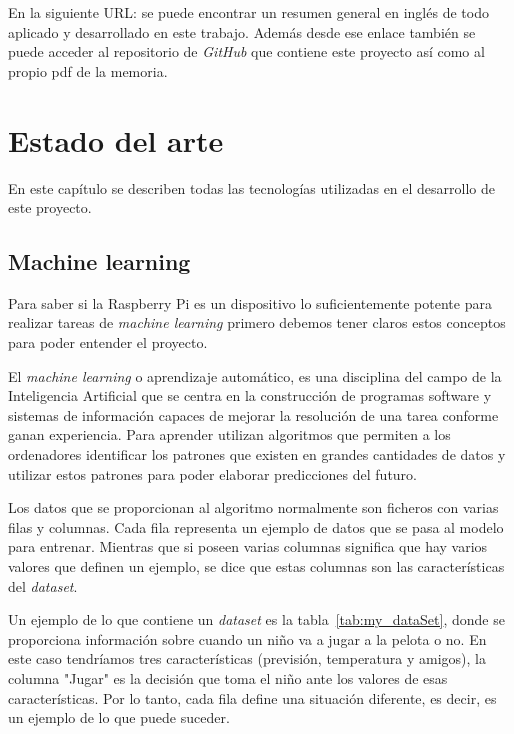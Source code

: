 \documentclass[a4paper, 12pt]{book}
\begin{document}
En la siguiente URL: se puede encontrar un resumen general en inglés de todo aplicado y desarrollado en este trabajo. Además desde ese enlace también se puede acceder al repositorio de \textit{GitHub} que contiene este proyecto así como al propio pdf de la memoria.

\cleardoublepage


\chapter{Estado del arte}               %
\label{chap:tecnologias}

En este capítulo se describen todas las tecnologías utilizadas en el desarrollo de este proyecto.

\section{Machine learning}
\label{sec:machine_learning}

Para saber si la Raspberry Pi es un dispositivo lo suficientemente potente para realizar tareas de \textit{machine learning} primero debemos tener claros estos conceptos para poder entender el proyecto.

 El \textit{machine learning} o aprendizaje automático, es una disciplina del campo de la Inteligencia Artificial que se centra en la construcción de programas software y sistemas de información capaces de mejorar la resolución de una tarea conforme ganan experiencia. Para aprender utilizan algoritmos que permiten a los ordenadores identificar los patrones que existen en grandes cantidades de datos y utilizar estos patrones para poder elaborar predicciones del futuro. 
 
 Los datos que se proporcionan al algoritmo normalmente son ficheros con varias filas y columnas. Cada fila representa un ejemplo de datos que se pasa al modelo para entrenar. Mientras que si poseen varias columnas significa que hay varios valores que definen un ejemplo, se dice que estas columnas son las características del \textit{dataset}. 
 
 Un ejemplo de lo que contiene un \textit{dataset} es la tabla~\ref{tab:my_dataSet}, donde se proporciona información sobre cuando un niño va a jugar a la pelota o no. En este caso tendríamos tres características (previsión, temperatura y amigos), la columna "Jugar" es la decisión que toma el niño ante los valores de esas características. Por lo tanto, cada fila define una situación diferente, es decir, es un ejemplo de lo que puede suceder.
 
\end{document}
